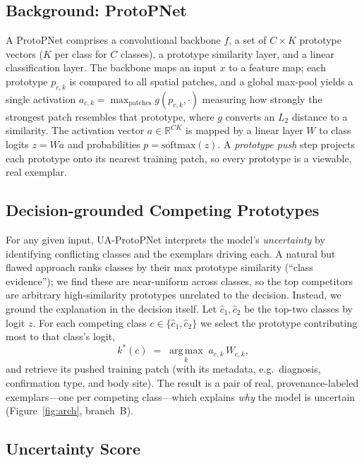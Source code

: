 \documentclass[10pt]{article}
\newcommand{\method}{UA-ProtoPNet}
\begin{document}
\subsection{Background: ProtoPNet}

A ProtoPNet \parencite{chen2019protopnet} comprises a convolutional backbone
$f$, a set of $C{\times}K$ prototype vectors ($K$ per class for $C$ classes), a
prototype similarity layer, and a linear classification layer. The backbone maps
an input $x$ to a feature map; each prototype $p_{c,k}$ is compared to all
spatial patches, and a global max-pool yields a single activation
$a_{c,k}=\max_{\text{patches}} g(p_{c,k}, \cdot)$ measuring how strongly the
strongest patch resembles that prototype, where $g$ converts an $L_2$ distance to
a similarity. The activation vector $a\in\mathbb{R}^{CK}$ is mapped by a linear
layer $W$ to class logits $z = Wa$ and probabilities $p=\mathrm{softmax}(z)$.
A \emph{prototype push} step projects each prototype onto its nearest training
patch, so every prototype is a viewable, real exemplar.

\subsection{Decision-grounded Competing Prototypes}

For any given input, \method{} interprets the model's \emph{uncertainty} by identifying
conflicting classes and the exemplars driving each. A natural but
flawed approach ranks classes by their max prototype similarity (``class
evidence''); we find these are near-uniform across classes, so the top
competitors are arbitrary high-similarity prototypes unrelated to the decision.
Instead, we ground the explanation in the decision itself. Let
$\hat{c}_1, \hat{c}_2$ be the top-two classes by logit $z$. For each competing
class $c\in\{\hat{c}_1,\hat{c}_2\}$ we select the prototype contributing most to
that class's logit,
\begin{equation}
k^\ast(c) \;=\; \operatorname*{arg\,max}_{k} \; a_{c,k}\, W_{c,k},
\end{equation}
and retrieve its pushed training patch (with its metadata, e.g.\ diagnosis,
confirmation type, and body site). The result is a pair of real, provenance-labeled exemplars---one per competing class---which explains \emph{why} the model
is uncertain (Figure~\ref{fig:arch}, branch~B).

\subsection{Uncertainty Score}
\end{document}
